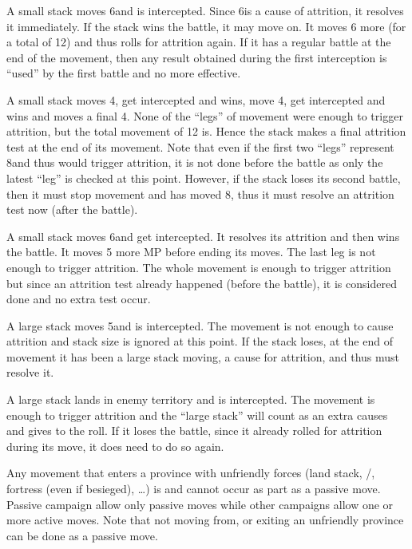 \begin{exemple}
  A small stack moves 6\MP and is intercepted. Since 6\MP is a cause of
  attrition, it resolves it immediately. If the stack wins the battle, it may
  move on. It moves 6 more \MP (for a total of 12) and thus rolls for
  attrition again. If it has a regular battle at the end of the movement, then
  any  result obtained during the first interception is
  ``used'' by the first battle and no more effective.

  \smallskip

  A small stack moves 4\MP, get intercepted and wins, move 4\MP, get
  intercepted and wins and moves a final 4\MP. None of the ``legs'' of
  movement were enough to trigger attrition, but the total movement of 12\MP
  is. Hence the stack makes a final attrition test at the end of its
  movement. Note that even if the first two ``legs'' represent 8\MP and thus
  would trigger attrition, it is not done before the battle as only the latest
  ``leg'' is checked at this point. However, if the stack loses its second
  battle, then it must stop movement and has moved 8\MP, thus it must resolve
  an attrition test now (after the battle).

  \smallskip

  A small stack moves 6\MP and get intercepted. It resolves its attrition and
  then wins the battle. It moves 5 more MP before ending its moves. The last
  leg is not enough to trigger attrition. The whole movement is enough to
  trigger attrition but since an attrition test already happened (before the
  battle), it is considered done and no extra test occur.

  \smallskip

  A large stack moves 5\MP and is intercepted. The movement is not enough to
  cause attrition and stack size is ignored at this point. If the stack loses,
  at the end of movement it has been a large stack moving, a cause for
  attrition, and thus must resolve it.

  A large stack lands in enemy territory and is intercepted. The movement is
  enough to trigger attrition and the ``large stack'' will count as an extra
  causes and gives  to the roll. If it loses the battle, since it
  already rolled for attrition during its move, it does need to do so again.
\end{exemple}

Any movement that enters a province with unfriendly forces (land stack,
\REVOLT/\REBELLION, fortress (even if besieged), \ldots) is  and
cannot occur as part as a passive move. Passive campaign allow only passive
moves while other campaigns allow one or more active moves. Note that not
moving from, or exiting an unfriendly province can be done as a passive move.

